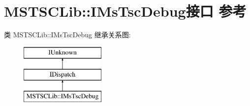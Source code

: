 \hypertarget{interface_m_s_t_s_c_lib_1_1_i_ms_tsc_debug}{}\section{M\+S\+T\+S\+C\+Lib\+:\+:I\+Ms\+Tsc\+Debug接口 参考}
\label{interface_m_s_t_s_c_lib_1_1_i_ms_tsc_debug}
类 M\+S\+T\+S\+C\+Lib\+:\+:I\+Ms\+Tsc\+Debug 继承关系图\+:\begin{figure}[H]
\begin{center}
\leavevmode
\includegraphics[height=3.000000cm]{interface_m_s_t_s_c_lib_1_1_i_ms_tsc_debug}
\end{center}
\end{figure}
